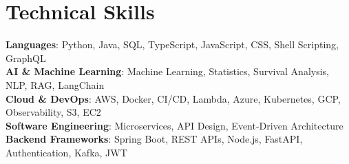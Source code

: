 \documentclass[letterpaper,11pt]{article}
\begin{document}
\section{Technical Skills}
 \begin{itemize}[leftmargin=0.15in, label={}]
    \small{\item{
     \textbf{Languages}{: Python, Java, SQL, TypeScript, JavaScript, CSS, Shell Scripting, GraphQL} \\
     \textbf{AI \& Machine Learning}{: Machine Learning, Statistics, Survival Analysis, NLP, RAG, LangChain} \\
     \textbf{Cloud \& DevOps}{: AWS, Docker, CI/CD, Lambda, Azure, Kubernetes, GCP, Observability, S3, EC2} \\
     \textbf{Software Engineering}{: Microservices, API Design, Event-Driven Architecture} \\
     \textbf{Backend Frameworks}{: Spring Boot, REST APIs, Node.js, FastAPI, Authentication, Kafka, JWT} \\
    }}
 \end{itemize}
\end{document}
